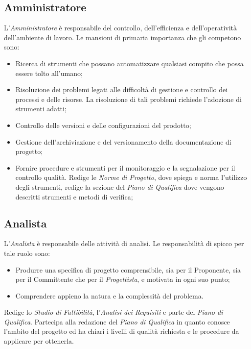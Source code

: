 \subsection{Amministratore}
L’\textit{Amministratore} è responsabile del controllo, dell'efficienza e dell'operatività dell'ambiente di lavoro. Le mansioni di primaria importanza che gli competono sono:
\begin{itemize}

\item Ricerca di strumenti che possano automatizzare qualsiasi compito che possa essere tolto all'umano;
\item Risoluzione dei problemi legati alle difficoltà di gestione e controllo dei processi e delle risorse. La risoluzione di tali problemi richiede l'adozione di strumenti adatti;
\item Controllo delle versioni e delle configurazioni del prodotto;
\item Gestione dell'archiviazione e del versionamento della documentazione di progetto;
\item Fornire procedure e strumenti per il monitoraggio e la segnalazione per il controllo qualità.
Redige le \textit{Norme di Progetto}, dove spiega e norma l'utilizzo degli strumenti, redige la sezione del \textit{Piano di Qualifica} dove vengono descritti strumenti e metodi di verifica;
\end{itemize}

\subsection{Analista}
L’\textit{Analista} è responsabile delle attività di analisi. Le responsabilità di spicco per tale ruolo sono:
\begin{itemize}
\item Produrre una specifica di progetto comprensibile, sia per il Proponente, sia per il
Committente che per il \textit{Progettista}, e motivata in ogni suo punto;
\item Comprendere appieno la natura e la complessità del problema.
\end{itemize}
Redige lo \textit{Studio di Fattibilità}, l’\textit{Analisi dei Requisiti} e parte del \textit{Piano di Qualifica}.
Partecipa alla redazione del \textit{Piano di Qualifica} in quanto conosce l’ambito del progetto ed ha chiari i livelli di qualità richiesta e le procedure da applicare per ottenerla.

